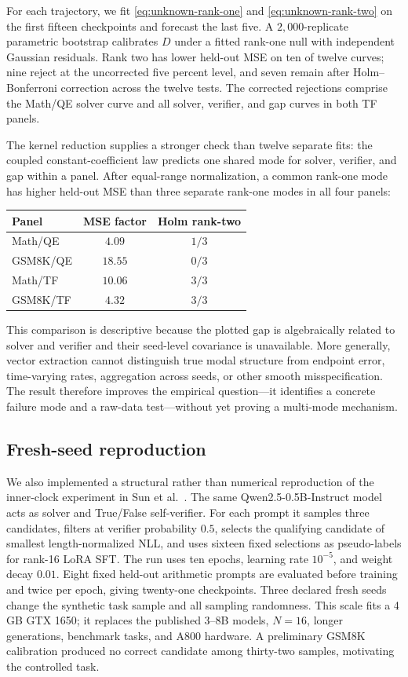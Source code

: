 \documentclass[10pt,twocolumn]{article}
\begin{document}
For each trajectory, we fit \eqref{eq:unknown-rank-one} and
\eqref{eq:unknown-rank-two} on the first fifteen checkpoints and forecast the
last five.  A $2{,}000$-replicate parametric bootstrap calibrates $D$ under a
fitted rank-one null with independent Gaussian residuals.  Rank two has lower
held-out MSE on ten of twelve curves; nine reject at the uncorrected five
percent level, and seven remain after Holm--Bonferroni correction across the
twelve tests.  The corrected rejections comprise the Math/QE solver curve and
all solver, verifier, and gap curves in both TF panels.

The kernel reduction supplies a stronger check than twelve separate fits: the
coupled constant-coefficient law predicts one shared mode for solver,
verifier, and gap within a panel.  After equal-range normalization, a common
rank-one mode has higher held-out MSE than three separate rank-one modes in all
four panels:
\begin{center}
\begin{tabular}{lcc}
\hline
Panel & MSE factor & Holm rank-two\\
\hline
Math/QE  & $4.09$  & $1/3$\\
GSM8K/QE & $18.55$ & $0/3$\\
Math/TF  & $10.06$ & $3/3$\\
GSM8K/TF & $4.32$  & $3/3$\\
\hline
\end{tabular}
\end{center}
This comparison is descriptive because the plotted gap is algebraically
related to solver and verifier and their seed-level covariance is unavailable.
More generally, vector extraction cannot distinguish true modal structure from
endpoint error, time-varying rates, aggregation across seeds, or other smooth
misspecification.  The result therefore improves the empirical question---it
identifies a concrete failure mode and a raw-data test---without yet proving a
multi-mode mechanism.

\subsection{Fresh-seed reproduction}

We also implemented a structural rather than numerical reproduction of the
inner-clock experiment in Sun et al.\ \cite{sun2026}.  The same
Qwen2.5-0.5B-Instruct model acts as solver and True/False self-verifier.  For
each prompt it samples three candidates, filters at verifier probability
$0.5$, selects the qualifying candidate of smallest length-normalized NLL, and
uses sixteen fixed selections as pseudo-labels for rank-16 LoRA SFT.  The run
uses ten epochs, learning rate $10^{-5}$, and weight decay $0.01$.  Eight fixed
held-out arithmetic prompts are evaluated before training and twice per epoch,
giving twenty-one checkpoints.  Three declared fresh seeds change the
synthetic task sample and all sampling randomness.  This scale fits a 4 GB GTX
1650; it replaces the published 3--8B models, $N=16$, longer generations,
benchmark tasks, and A800 hardware.  A preliminary GSM8K calibration produced
no correct candidate among thirty-two samples, motivating the controlled task.
\end{document}
